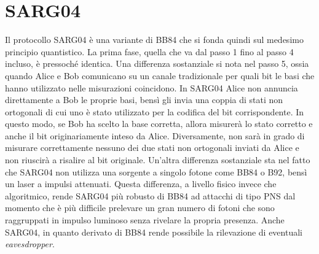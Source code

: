 \section{SARG04}
\label{sec:sarg04}
Il protocollo SARG04 \cite{sarg04} è una variante di BB84 che si fonda quindi sul medesimo principio quantistico. La prima fase, quella che va dal passo 1 fino al passo 4 incluso, è pressoché identica. Una differenza sostanziale si nota nel passo 5, ossia quando Alice e Bob comunicano su un canale tradizionale per quali bit le basi che hanno utilizzato nelle misurazioni coincidono. In SARG04 Alice non annuncia direttamente a Bob le proprie basi, bensì gli invia una coppia di stati non ortogonali di cui uno è stato utilizzato per la codifica del bit corrispondente. In questo modo, se Bob ha scelto la base corretta, allora misurerà lo stato corretto e anche il bit originariamente inteso da Alice. Diversamente, non sarà in grado di misurare correttamente nessuno dei due stati non ortogonali inviati da Alice e non riuscirà a risalire al bit originale.
Un'altra differenza sostanziale sta nel fatto che SARG04 non utilizza una sorgente a singolo fotone come BB84 o B92, bensì un laser a impulsi attenuati. Questa differenza, a livello fisico invece che algoritmico, rende SARG04 più robusto di BB84 ad attacchi di tipo PNS \cite{elboukhari} dal momento che è più difficile prelevare un gran numero di fotoni che sono raggruppati in impulso luminoso senza rivelare la propria presenza.
Anche SARG04, in quanto derivato di BB84 rende possibile la rilevazione di eventuali \textit{eavesdropper}.